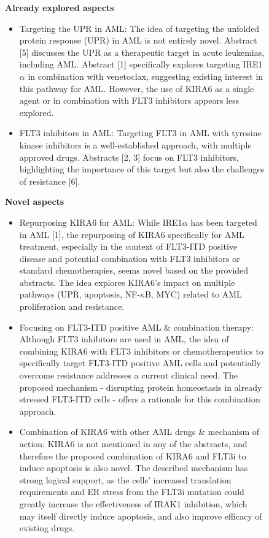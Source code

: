 \begin{figure}[htbp!]
\begin{tcolorbox}[
    colback=black!5!white,
    colframe=black!60!white,
    title=\textbf{KIRA6 for AML (continued)},
    fonttitle=\bfseries,
    arc=3mm,
    boxrule=1pt,
    bottomrule=2pt,
]
\textbf{Already explored aspects}
\begin{itemize}
    \item  Targeting the UPR in AML: The idea of targeting the unfolded protein response (UPR) in AML is not entirely novel. Abstract [5] discusses the UPR as a therapeutic target in acute leukemias, including AML. Abstract [1] specifically explores targeting IRE1$\alpha$ in combination with venetoclax, suggesting existing interest in this pathway for AML.  However, the use of KIRA6 as a single agent or in combination with FLT3 inhibitors appears less explored.
    \item FLT3 inhibitors in AML: Targeting FLT3 in AML with tyrosine kinase inhibitors is a well-established approach, with multiple approved drugs.  Abstracts [2, 3] focus on FLT3 inhibitors, highlighting the importance of this target but also the challenges of resistance [6].
\end{itemize}

\textbf{Novel aspects}
\begin{itemize}
    \item Repurposing KIRA6 for AML: While IRE1$\alpha$ has been targeted in AML [1], the repurposing of KIRA6 specifically for AML treatment, especially in the context of FLT3-ITD positive disease and potential combination with FLT3 inhibitors or standard chemotherapies, seems novel based on the provided abstracts.  The idea explores KIRA6's impact on multiple pathways (UPR, apoptosis, NF-$\kappa$B, MYC) related to AML proliferation and resistance.
    \item Focusing on FLT3-ITD positive AML \& combination therapy: Although FLT3 inhibitors are used in AML, the idea of combining KIRA6 with FLT3 inhibitors or chemotherapeutics to specifically target FLT3-ITD positive AML cells and potentially overcome resistance addresses a current clinical need. The proposed mechanism - disrupting protein homeostasis in already stressed FLT3-ITD cells - offers a rationale for this combination approach.
    \item Combination of KIRA6 with other AML drugs \& mechanism of action: KIRA6 is not mentioned in any of the abstracts, and therefore the proposed combination of KIRA6 and FLT3i to induce apoptosis is also novel. The described mechanism has strong logical support, as the cells' increased translation requirements and ER stress from the FLT3i mutation could greatly increase the effectiveness of IRAK1 inhibition, which may itself directly induce apoptosis, and also improve efficacy of existing drugs.
\end{itemize}


\end{tcolorbox}
\end{figure}
